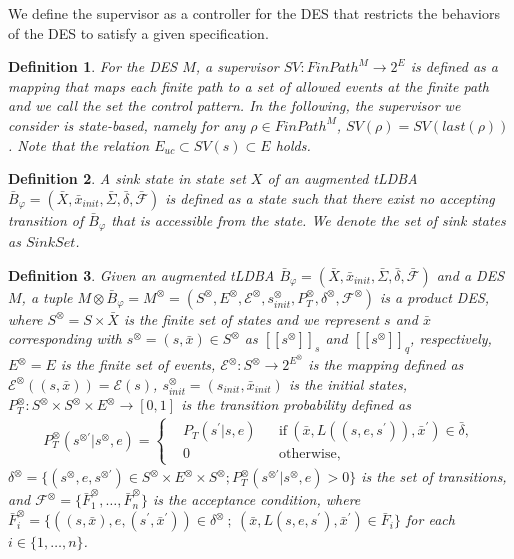 \documentclass[letterpaper, 10 pt, conference]{ieeeconf}
\newtheorem{definition}{Definition}
\newcommand{\mysps}{\ensuremath{[\![s^{\otimes}]\!]}_s}
\newcommand{\myspq}{\ensuremath{[\![s^{\otimes}]\!]}_q}
\begin{document}
We define the supervisor as a controller for the DES that restricts the behaviors of the DES to satisfy a given specification.

\begin{definition}
For the DES $M$,  a supervisor $SV : FinPath^{M} \rightarrow 2^E$ is defined as a mapping that maps each finite path to a set of allowed events at the finite path and we call the set the control pattern. In the following, the supervisor we consider is {\it state-based}, namely for any $\rho \in FinPath^{M}$, $SV(\rho) = SV(last(\rho))$. Note that the relation $E_{uc} \subset SV(s) \subset E$ holds.
\end{definition}

\begin{definition}
  A sink state in state set $X$ of an augmented tLDBA $\bar{B}_{\varphi} = (\bar{X}, \bar{x}_{init},\bar{\Sigma},\bar{\delta},\bar{\mathcal{F}})$ is defined as a state such that there exist no accepting transition of $\bar{B}_{\varphi}$ that is accessible from the state. We denote the set of sink states as $Sink Set$.
\end{definition}

\begin{definition}
  Given an augmented tLDBA $\bar{B}_{\varphi} = (\bar{X}, \bar{x}_{init},\bar{\Sigma},\bar{\delta},\bar{\mathcal{F}})$ and a DES $M$, a tuple $M \otimes \bar{B}_{\varphi} = M^{\otimes} = (S^{\otimes}, E^{\otimes}, {\mathcal E}^{\otimes}, s_{init}^{\otimes}, P^{\otimes}_T, \delta^{\otimes}, {\mathcal F}^{\otimes})$ is a product DES, where
  $S^{\otimes} = S \times \bar{X}$ is the finite set of states and we represent $s$ and $\bar{x}$ corresponding with $s^{\otimes} = (s,\bar{x}) \in S^{\otimes}$ as $\mysps$ and $\myspq$, respectively, $E^{\otimes}=E$ is the finite set of events, ${\mathcal E}^{\otimes} : S^{\otimes} \rightarrow 2^{E^{\otimes}}$ is the mapping defined as ${\mathcal E}^{\otimes}((s,\bar{x})) = {\mathcal E}(s)$, $s_{init}^{\otimes} = (s_{init},\bar{x}_{init})$ is the initial states, $P^{\otimes}_T : S^{\otimes} \times S^{\otimes} \times E^{\otimes} \rightarrow [0,1]$ is the transition probability defined as
  \begin{align}
    P^{\otimes}_T(s^{\otimes \prime} | s^{\otimes}, e) =
    \left\{
    \begin{aligned}
      &P_T(s^{\prime} | s, e) &   &\text{if}\  (\bar{x}, L((s,e,s^{\prime})), \bar{x}^{\prime}) \in \bar{\delta},\\
      &0 &   &\text{otherwise} ,
    \end{aligned}
    \right. \nonumber
  \end{align}
  $\delta^{\otimes} = \{ (s^{\otimes}, e, s^{\otimes \prime}) \in S^{\otimes} \times E^{\otimes} \times S^{\otimes} ; P^{\otimes}_T(s^{\otimes \prime} | s^{\otimes}, e) > 0 \}$ is the set of transitions, and ${\mathcal F}^{\otimes} = \{ \bar{F}^{\otimes}_1, \ldots ,\bar{F}^{\otimes}_n \}$ is the acceptance condition, where $\bar{F}^{\otimes}_i = \{ ((s,\bar{x}), e, (s^{\prime}, \bar{x}^{\prime})) \in \delta^{\otimes}\ ;\ (\bar{x}, L(s,e,s^{\prime}), \bar{x}^{\prime}) \in \bar{F}_i \}$ for each $ i \in \{ 1, \ldots ,n \}$.
\end{definition}
\end{document}
